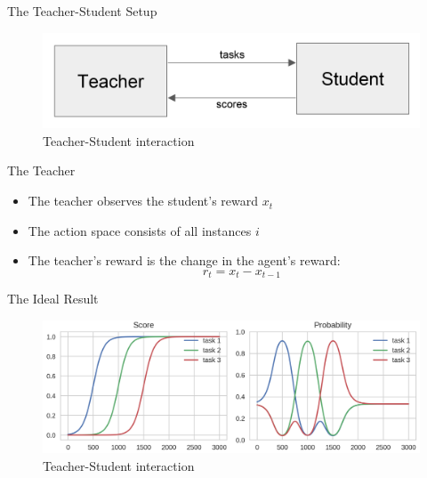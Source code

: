 \documentclass[aspectratio=169]{../latex_main/tntbeamer}  %
\begin{document}
\begin{frame}[c]{The Teacher-Student Setup~}
	
	\begin{figure}
	\centering
	\includegraphics[scale= 0.7]{images/t05/teacher_student.png}
	\caption{Teacher-Student interaction}
	\end{figure}
	
\end{frame}

\begin{frame}[c]{The Teacher}
	\begin{itemize}
		\item The teacher observes the student's reward $x_t$
		\item The action space consists of all instances $i$
		\item The teacher's reward is the change in the agent's reward:
			$$ r_t = x_t - x_{t-1}$$
	\end{itemize}
	
\end{frame}

\begin{frame}[c]{The Ideal Result~}
	
	\begin{figure}
	\centering
	\includegraphics[scale= 0.5]{images/t05/ideal_teacher.png}
	\caption{Teacher-Student interaction}
	\end{figure}

\end{frame}
\end{document}
